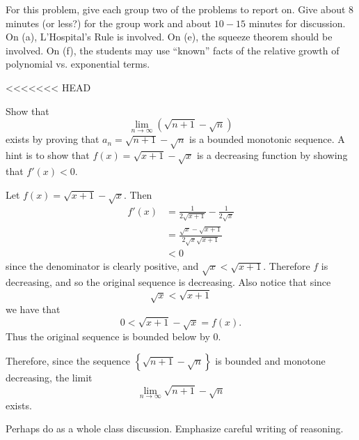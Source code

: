 \documentclass[noinstructornotes]{ximera}
\begin{document}
\begin{problem}
\begin{enumerate}
\begin{problem}
\end{problem}

\begin{instructorNotes}
For this problem, give each group two of the problems to report on.  
Give about $8$ minutes (or less?) for the group work and about $10-15$ minutes for discussion.  
On (a), L'Hospital's Rule is involved.  
On (e), the squeeze theorem should be involved.  
On (f), the students may use ``known'' facts of the relative growth of polynomial vs. exponential terms.
\end{instructorNotes}







<<<<<<< HEAD
\begin{problem}
Show that 
$$\lim_{n \to \infty} \left( \sqrt{n+1} - \sqrt{n} \right)$$ 
exists by proving that $a_n = \sqrt{n+1} - \sqrt{n}$ is a bounded monotonic sequence.  A hint is to show that $f(x) = \sqrt{x+1} - \sqrt{x}$ is a decreasing function by showing that $f'(x) < 0$.  
	\begin{freeResponse}
	Let $f(x) = \sqrt{x+1} - \sqrt{x}$.  Then
		\begin{align*}
		f'(x) 
		&= \frac{1}{2 \sqrt{x+1}} - \frac{1}{2 \sqrt{x}}  \\
		&= \frac{\sqrt{x} - \sqrt{x+1}}{2 \sqrt{x}\sqrt{x+1}}  \\
		&< 0
		\end{align*}
	since the denominator is clearly positive, and $\sqrt{x} < \sqrt{x+1}$.
	Therefore $f$ is decreasing, and so the original sequence is decreasing.  
	Also notice that since 
	$$\sqrt{x} < \sqrt{x+1}$$
	we have that 
	$$0 < \sqrt{x+1} - \sqrt{x} = f(x).$$
	Thus the original sequence is bounded below by $0$.  \

	Therefore, since the sequence $\left\{ \sqrt{n+1} - \sqrt{n} \right\}$ is bounded and monotone decreasing, the limit
		\[
		\lim_{n \to \infty} \sqrt{n+1} - \sqrt{n}
		\]
	exists.
	\end{freeResponse}
		
\end{problem}

\begin{instructorNotes}
Perhaps do as a whole class discussion.  
Emphasize careful writing of reasoning.
\end{instructorNotes}








\end{enumerate}
\end{problem}
\end{document}
